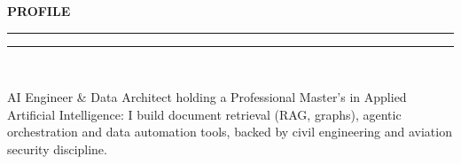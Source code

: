 \documentclass[10pt,a4paper]{article}
\newcommand{\mainSecTitle}[1]{%
  \vspace{11pt}%
  {\fontsize{11.0}{13.0}\selectfont\textbf{\color{sectionNavy}\MakeUppercase{#1}}}\\[2.5pt]%
  {\color{accentTeal}\rule{19mm}{1.2pt}\color{subtleRule}\rule{\dimexpr\linewidth-19mm\relax}{0.6pt}}\\[6pt]%
}
\begin{document}
\hspace{0.042\textwidth}%
\begin{minipage}[t]{0.648\textwidth}
  \raggedright
  \vspace{0pt}
  \mainSecTitle{PROFILE}
  \begin{tcolorbox}[enhanced, frame hidden, colback=sidebarBg,
    borderline west={2.2pt}{0pt}{accentTeal},
    left=8pt, right=7pt, top=7pt, bottom=7pt, boxsep=0pt, arc=1.5pt]
    \raggedright
    {\fontsize{10.0}{13.8}\selectfont\color{bodyText}AI Engineer \& Data Architect holding a Professional Master’s in Applied Artificial Intelligence: I build document retrieval (RAG, graphs), agentic orchestration and data automation tools, backed by civil engineering and aviation security discipline.}
  \end{tcolorbox}


\end{minipage}
\end{document}
